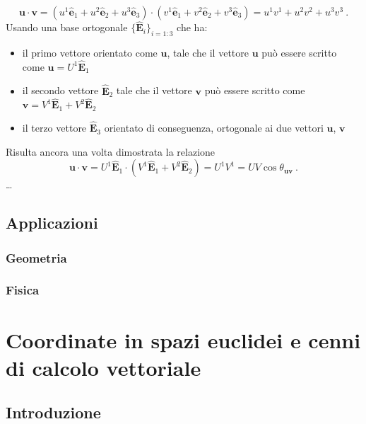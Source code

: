 \begin{equation}
    \mathbf{u} \cdot \mathbf{v} =
    ( u^1 \mathbf{\hat{e}}_1 + u^2 \mathbf{\hat{e}}_2 + u^3 \mathbf{\hat{e}}_3) \cdot ( v^1 \mathbf{\hat{e}}_1 + v^2 \mathbf{\hat{e}}_2 + v^3 \mathbf{\hat{e}}_3) = u^1 v^1 + u^2 v^2 + u^3 v^3 \ . 
\end{equation}
Usando una base ortogonale $\{ \mathbf{\hat{E}}_i \}_{i=1:3}$ che ha:
\begin{itemize}
    \item il primo vettore orientato come $\mathbf{u}$, tale che il vettore $\mathbf{u}$ può essere scritto come $\mathbf{u} = U^1 \mathbf{\hat{E}}_1$
    \item il secondo vettore $\mathbf{\hat{E}}_2$ tale che il vettore $\mathbf{v}$ può essere scritto come $\mathbf{v} = V^1 \mathbf{\hat{E}}_1 + V^2 \mathbf{\hat{E}}_2$
    \item il terzo vettore $\mathbf{\hat{E}}_3$ orientato di conseguenza, ortogonale ai due vettori $\mathbf{u}$, $\mathbf{v}$
\end{itemize}
Risulta ancora una volta dimostrata la relazione
\begin{equation}
    \mathbf{u} \cdot \mathbf{v} =
      U^1 \mathbf{\hat{E}}_1 \cdot ( V^1 \mathbf{\hat{E}}_1 + V^2 \mathbf{\hat{E}}_2) = U^1 V^1 = U V \cos \theta_{\mathbf{u} \mathbf{v}} \ . 
\end{equation}
{\color{red} \dots}

\section{Applicazioni}
\subsection{Geometria}
\subsection{Fisica}

\chapter{Coordinate in spazi euclidei e cenni di calcolo vettoriale}

\section{Introduzione}
\begin{definition}
\end{definition}

